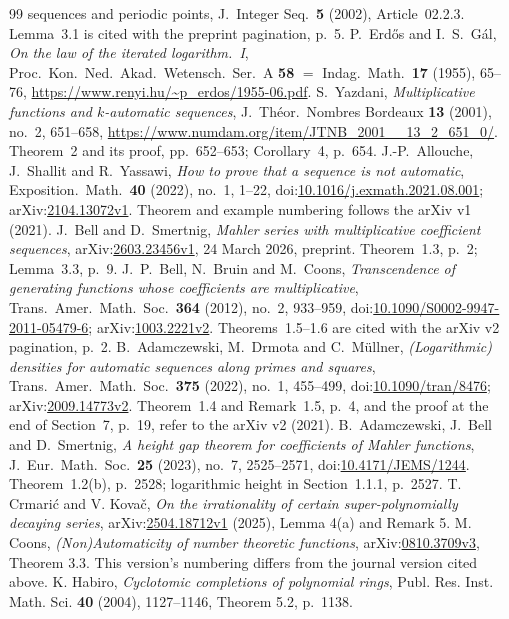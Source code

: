 \begin{thebibliography}{99}
{sequences and periodic points}, J.\ Integer Seq.\ \textbf{5} (2002),
Article~02.2.3. Lemma~3.1 is cited with the preprint pagination, p.~5.
P.~Erd\H{o}s and I.~S.~G\'al, \emph{On the law of the iterated logarithm.~I},
Proc.\ Kon.\ Ned.\ Akad.\ Wetensch.\ Ser.~A \textbf{58} $=$ Indag.\ Math.\
\textbf{17} (1955), 65--76, \url{https://www.renyi.hu/~p_erdos/1955-06.pdf}.
\bibitem{yazdani2001} S.~Yazdani,
\emph{Multiplicative functions and $k$-automatic sequences},
J.\ Th\'eor.\ Nombres Bordeaux \textbf{13} (2001), no.~2, 651--658,
\url{https://www.numdam.org/item/JTNB_2001__13_2_651_0/}.
Theorem~2 and its proof, pp.~652--653; Corollary~4, p.~654.
 J.-P.~Allouche, J.~Shallit and R.~Yassawi,
\emph{How to prove that a sequence is not automatic},
Exposition.\ Math.\ \textbf{40} (2022), no.~1, 1--22,
doi:\href{https://doi.org/10.1016/j.exmath.2021.08.001}{10.1016/j.exmath.2021.08.001};
arXiv:\href{https://arxiv.org/abs/2104.13072v1}{2104.13072v1}.
Theorem and example numbering follows the arXiv v1 (2021).
 J.~Bell and D.~Smertnig,
\emph{Mahler series with multiplicative coefficient sequences},
arXiv:\href{https://arxiv.org/abs/2603.23456v1}{2603.23456v1},
24 March 2026, preprint. Theorem~1.3, p.~2; Lemma~3.3, p.~9.
 J.~P.~Bell, N.~Bruin and M.~Coons,
\emph{Transcendence of generating functions whose coefficients are multiplicative},
Trans.\ Amer.\ Math.\ Soc.\ \textbf{364} (2012), no.~2, 933--959,
doi:\href{https://doi.org/10.1090/S0002-9947-2011-05479-6}{10.1090/S0002-9947-2011-05479-6};
arXiv:\href{https://arxiv.org/abs/1003.2221v2}{1003.2221v2}.
Theorems~1.5--1.6 are cited with the arXiv v2 pagination, p.~2.
 B.~Adamczewski, M.~Drmota and C.~M\"ullner,
\emph{(Logarithmic) densities for automatic sequences along primes and squares},
Trans.\ Amer.\ Math.\ Soc.\ \textbf{375} (2022), no.~1, 455--499,
doi:\href{https://doi.org/10.1090/tran/8476}{10.1090/tran/8476};
arXiv:\href{https://arxiv.org/abs/2009.14773v2}{2009.14773v2}.
Theorem~1.4 and Remark~1.5, p.~4, and the proof at the end of Section~7,
p.~19, refer to the arXiv v2 (2021).
B.~Adamczewski, J.~Bell and D.~Smertnig,
\emph{A height gap theorem for coefficients of Mahler functions},
J.~Eur.~Math.~Soc.\ \textbf{25} (2023), no.~7, 2525--2571,
doi:\href{https://doi.org/10.4171/JEMS/1244}{10.4171/JEMS/1244}.
Theorem~1.2(b), p.~2528; logarithmic height in Section~1.1.1, p.~2527.
\bibitem{crmarickovac2025signed} T. Crmari\'{c} and V. Kova\v{c},
  \emph{On the irrationality of certain super-polynomially decaying series},
  arXiv:\href{https://arxiv.org/abs/2504.18712v1}{2504.18712v1} (2025),
  Lemma 4(a) and Remark 5.
 M. Coons,
  \emph{(Non)Automaticity of number theoretic functions},
  arXiv:\href{https://arxiv.org/abs/0810.3709v3}{0810.3709v3}, Theorem 3.3.
  This version's numbering differs from the journal version cited above.
\bibitem{habiro2004signed} K. Habiro,
  \emph{Cyclotomic completions of polynomial rings},
  Publ. Res. Inst. Math. Sci. \textbf{40} (2004), 1127--1146,
  Theorem 5.2, p.~1138.

\end{thebibliography}
